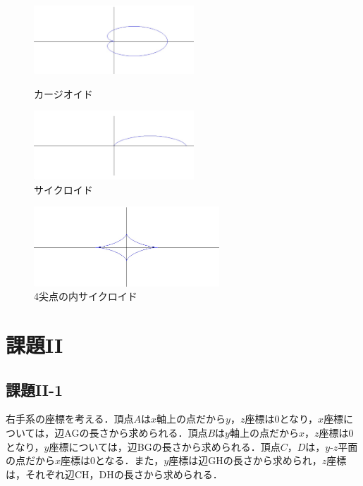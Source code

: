 \documentclass[]{jsarticle}
\begin{document}
\begin{figure}[htbp]
\begin{center}
\begin{minipage}[b]{0.45\textwidth}
  \begin{center}
    \includegraphics[width=6cm,keepaspectratio]{a.jpg}
    \caption{カージオイド}
    \label{fig:cardioid}
  \end{center}
\end{minipage}
\begin{minipage}[b]{0.45\textwidth}
  \begin{center}
    \includegraphics[width=6cm,keepaspectratio]{b.jpg}
    \caption{サイクロイド}
    \label{fig:hypocycloid}
  \end{center}
\end{minipage}
\end{center}
\end{figure}
\begin{figure}[htbp]
\begin{center}
\includegraphics[height=3cm,keepaspectratio]{c.jpg}
    \caption{4尖点の内サイクロイド}
    \label{fig:cycloid}
\end{center}
\end{figure}

\section{課題II}
\subsection{課題II-1}
右手系の座標を考える．頂点$A$は$x$軸上の点だから$y$，$z$座標は0となり，$x$座標については，辺AGの長さから求められる．頂点$B$は$y$軸上の点だから$x$，$z$座標は0となり，$y$座標については，辺BGの長さから求められる．頂点$C$，$D$は，$y$-$z$平面の点だから$x$座標は0となる．また，$y$座標は辺GHの長さから求められ，$z$座標は，それぞれ辺CH，DHの長さから求められる．
\end{document}
